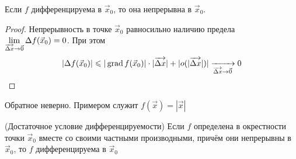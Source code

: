 \begin{theorem}
	Если $f$ дифференцируема в $\vec{x}_0$, то она непрерывна в $\vec{x}_0$.
\end{theorem}

\begin{proof}
	Непрерывность в точке $\vec{x}_0$ равносильно наличию предела $\lim\limits_{\overrightarrow{\Delta x} \to \vec{0}} \Delta f(\vec{x}_0) = 0$. При этом
	\[
		|\Delta f(\vec{x}_0)| \leqslant |\operatorname{grad} f(\vec{x}_0)| \cdot |\overrightarrow{\Delta x}| + |o(|\overrightarrow{\Delta x}|)| \xrightarrow[\overrightarrow{\Delta x} \to \vec{0}]{} 0
	\]
\end{proof}

\begin{example}
	Обратное неверно. Примером служит $f(\vec{x}) = |\vec{x}|$
\end{example}

\begin{theorem} (Достаточное условие дифференцируемости)
	Если $f$ определена в окрестности точки $\vec{x}_0$ вместе со своими частными производными, причём они непрерывны в $\vec{x}_0$, то $f$ дифференцируема в $\vec{x}_0$
\end{theorem}

